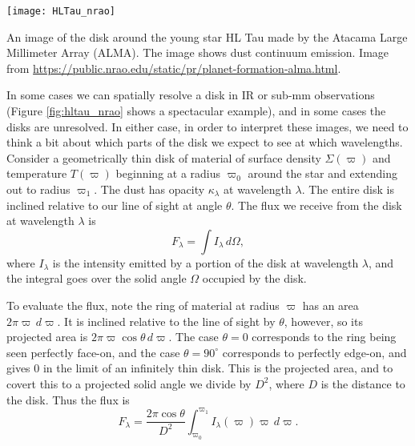 \begin{marginfigure}
\texttt{[image: HLTau\_nrao]}
\caption[ALMA image of the disk around HL Tau]{
\label{fig:hltau_nrao}
An image of the disk around the young star HL Tau made by the Atacama Large Millimeter Array (ALMA). The image shows dust continuum emission. Image from \url{https://public.nrao.edu/static/pr/planet-formation-alma.html}.
}
\end{marginfigure}

In some cases we can spatially resolve a disk in IR or sub-mm observations (Figure \ref{fig:hltau_nrao} shows a spectacular example), and in some cases the disks are unresolved. In either case, in order to interpret these images, we need to think a bit about which parts of the disk we expect to see at which wavelengths. Consider a geometrically thin disk of material of surface density $\Sigma(\varpi)$ and temperature $T(\varpi)$ beginning at a radius $\varpi_0$ around the star and extending out to radius $\varpi_1$. The dust has opacity $\kappa_\lambda$ at wavelength $\lambda$. The entire disk is inclined relative to our line of sight at angle $\theta$. The flux we receive from the disk at wavelength $\lambda$ is
\begin{equation}
F_{\lambda} = \int I_{\lambda}\, d\Omega,
\end{equation}
where $I_{\lambda}$ is the intensity emitted by a portion of the disk at wavelength $\lambda$, and the integral goes over the solid angle $\Omega$ occupied by the disk.

To evaluate the flux, note the ring of material at radius $\varpi$ has an area $2\pi \varpi \,d\varpi$. It is inclined relative to the line of sight by $\theta$, however, so its projected area is $2\pi \varpi \cos\theta\, d\varpi$. The case $\theta=0$ corresponds to the ring being seen perfectly face-on, and the case $\theta=90^\circ$ corresponds to perfectly edge-on, and gives 0 in the limit of an infinitely thin disk. This is the projected area, and to covert this to a projected solid angle we divide by $D^2$, where $D$ is the distance to the disk. Thus the flux is
\begin{equation}
F_{\lambda} = \frac{2\pi \cos\theta}{D^2} \int_{\varpi_0}^{\varpi_1} I_\lambda(\varpi) \varpi\, d\varpi.
\end{equation}

